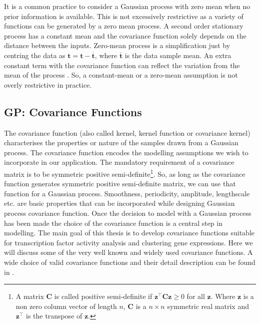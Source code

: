It is a common practice to consider a Gaussian process with zero mean when no prior information is available. This is not excessively restrictive as a variety of functions can be generated by a zero mean process. A second order stationary process has a constant mean and the covariance function solely depends on the distance between the inputs. Zero-mean process is a simplification just by centring the data as $\textbf{t} = \textbf{t} - \overline{\textbf{t}}$, where $\overline{\textbf{t}}$ is the data sample mean. An extra constant term with the covariance function can reflect the variation from the mean of the process \cite{MacKay:2003}. So, a constant-mean or a zero-mean assumption is not overly restrictive in practice.

\subsection{GP: Covariance Functions}
The covariance function (also called kernel, kernel function or covariance kernel) characterises the properties or nature of the samples drawn from a Gaussian process. The covariance function encodes the modelling assumptions we wish to incorporate in our application. The mandatory requirement of a covariance matrix is to be symmetric positive semi-definite\footnote{A matrix $\textbf{C}$ is called positive semi-definite if $\textbf{z}^{\top}\textbf{C}\textbf{z} \geq 0$ for all $\textbf{z}$. Where $\textbf{z}$ is a non zero column vector of length $n$, $\textbf{C}$ is a $n\times n$ symmetric real matrix and $\textbf{z}^{\top}$ is the transpose of $\textbf{z}$.}. So, as long as the covariance function generates symmetric positive semi-definite matrix, we can use that function for a Gaussian process. Smoothness, periodicity, amplitude, lengthscale etc. are basic properties that can be incorporated while designing Gaussian process covariance function. Once the decision to model with a Gaussian process has been made the choice of the covariance function is a central step in modelling. The main goal of this thesis is to develop covariance functions suitable for transcription factor activity analysis and clustering gene expressions. Here we will discuss some of the very well known and widely used covariance functions. A wide choice of valid covariance functions and their detail description can be found in \cite{Rasmussen_and_Williams:2006}.

